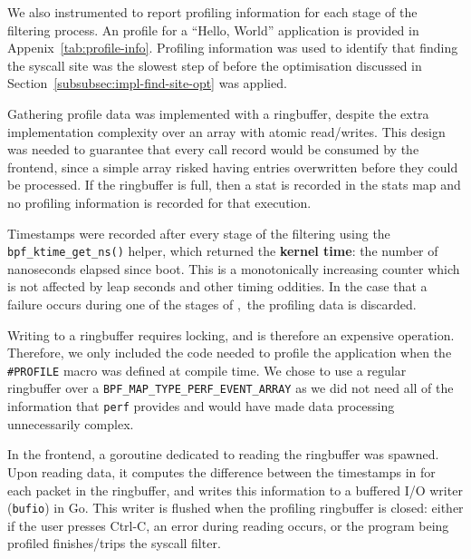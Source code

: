 We also instrumented \af to report profiling information for each stage of the
filtering process. An profile for a ``Hello, World'' application is provided in 
Appenix~\ref{tab:profile-info}. Profiling information was used to identify that
finding the syscall site was the slowest step of \af before the optimisation
discussed in Section~\ref{subsubsec:impl-find-site-opt} was applied.

Gathering profile data was implemented with a ringbuffer, despite the extra
implementation complexity over an array with atomic read/writes. This design was
needed to guarantee that every call record would be consumed by the frontend, since a 
simple array risked having entries overwritten before they could be processed.
If the ringbuffer is full, then a stat is recorded in the stats map and no
profiling information is recorded for that execution.

Timestamps were recorded after every stage of the filtering using the
\texttt{bpf\_ktime\_get\_ns()} helper, which returned the \textbf{kernel time}:
the number of nanoseconds elapsed since boot. This is a monotonically increasing
counter which is not affected by leap seconds and other timing oddities. In the
case that a failure occurs during one of the stages of \afss,~the profiling data
is discarded.


Writing to a ringbuffer requires locking, and is therefore an expensive
operation. Therefore, we only included the code needed to profile the
application when the \texttt{\#PROFILE} macro was defined at compile time.
We chose to use a regular ringbuffer over a 
\texttt{BPF\_MAP\_TYPE\_PERF\_EVENT\_ARRAY} as we did not need all of the
information that \texttt{perf} provides and would have made data processing
unnecessarily complex.

In the frontend, a goroutine dedicated to reading the ringbuffer was spawned.
Upon reading data, it computes the difference between the timestamps in for each 
packet in the ringbuffer, and writes this information to a buffered \ac{I/O} 
writer (\texttt{bufio}) in Go. This writer is flushed when the profiling 
ringbuffer is closed: either if the user presses Ctrl-C, an error during 
reading occurs, or the program being profiled finishes/trips the syscall 
filter.

